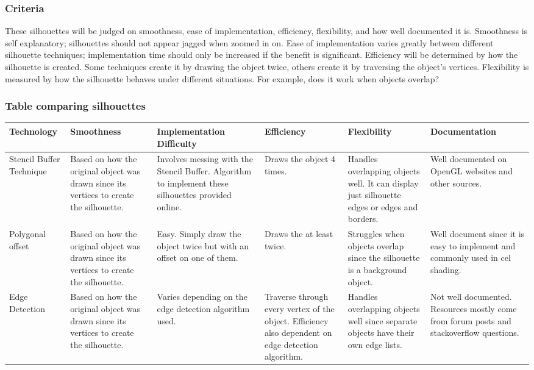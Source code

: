 \documentclass[10pt,journal,compsoc,draftclsnofoot]{IEEEtran}
\begin{document}
\subsubsection{Criteria}
These silhouettes will be judged on smoothness, ease of implementation, efficiency, flexibility, and how well documented it is.
Smoothness is self explanatory; silhouettes should not appear jagged when zoomed in on.
Ease of implementation varies greatly between different silhouette techniques; implementation time should only be increased if the benefit is significant.
Efficiency will be determined by how the silhouette is created. Some techniques create it by drawing the object twice, others create it by traversing the object's vertices.
Flexibility is measured by how the silhouette behaves under different situations. For example, does it work when objects overlap?

\subsubsection{Table comparing silhouettes}
\begin{tabular}{ | m{7em} | m{7em} | m{7em} | m{7em} | m{7em} | m{7em} |  } 
\hline
\textbf{Technology}  & \textbf{Smoothness} & \textbf{Implementation Difficulty} & \textbf{Efficiency} & \textbf{Flexibility} & \textbf{Documentation} \\ \hline
Stencil Buffer Technique & Based on how the original object was drawn since its vertices to create the silhouette. & Involves messing with the Stencil Buffer. Algorithm to implement these silhouettes provided online. & Draws the object 4 times. & Handles overlapping objects well. It can display just silhouette edges or edges and borders. & Well documented on OpenGL websites and other sources.  \\ \hline
Polygonal offset & Based on how the original object was drawn since its vertices to create the silhouette. & Easy. Simply draw the object twice but with an offset on one of them. & Draws the at least twice. & Struggles when objects overlap since the silhouette is a background object. & Well document since it is easy to implement and commonly used in cel shading.  \\ \hline
Edge Detection & Based on how the original object was drawn since its vertices to create the silhouette. & Varies depending on the edge detection algorithm used. & Traverse through every vertex of the object. Efficiency also dependent on edge detection algorithm. & Handles overlapping objects well since separate objects have their own edge lists. & Not well documented. Resources mostly come from forum posts and stackoverflow questions. \\ \hline
\end{tabular}
\end{document}
